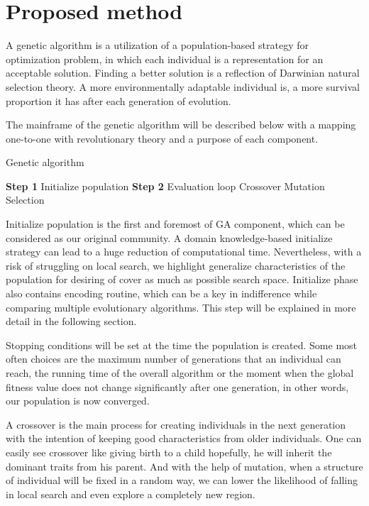 \section{Proposed method}
	A genetic algorithm is a utilization of a population-based strategy for optimization problem, in which each individual is a representation for an acceptable solution. Finding a better solution is a reflection of Darwinian natural selection theory. A more environmentally adaptable individual is, a more survival proportion it has after each generation of evolution.

	The mainframe of the genetic algorithm will be described below with a mapping one-to-one with revolutionary theory and a purpose of each component.

\begin{algorithm}
\caption{Genetic algorithm}
\begin{algorithmic}[0]
\State \textbf{Step 1} Initialize population
\State \textbf{Step 2} Evaluation loop
		\State Crossover
		\State Mutation
		\State Selection
	\EndWhile
\end{algorithmic}
\end{algorithm}

	Initialize population is the first and foremost of GA component, which can be considered as our original community. A domain knowledge-based initialize strategy can lead to a huge reduction of computational time. Nevertheless, with a risk of struggling on local search, we highlight generalize characteristics of the population for desiring of cover as much as possible search space. Initialize phase also contains encoding routine, which can be a key in indifference while comparing multiple evolutionary algorithms. This step will be explained in more detail in the following section.

	Stopping conditions will be set at the time the population is created. Some most often choices are the maximum number of generations that an individual can reach, the running time of the overall algorithm or the moment when the global fitness value does not change significantly after one generation, in other words, our population is now converged.

	A crossover is the main process for creating individuals in the next generation with the intention of keeping good characteristics from older individuals. One can easily see crossover like giving birth to a child hopefully, he will inherit the dominant traits from his parent. And with the help of mutation, when a structure of individual will be fixed in a random way, we can lower the likelihood of falling in local search and even explore a completely new region.

